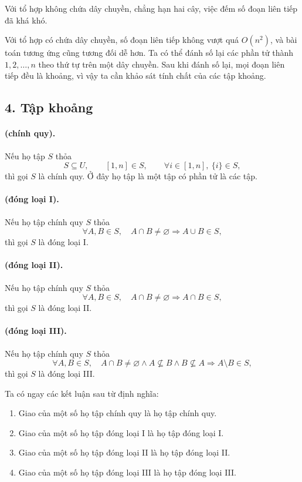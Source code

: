\documentclass[11pt]{article}
\begin{document}
Với tổ hợp không chứa dây chuyền, chẳng hạn hai cây, việc đếm số đoạn liên
tiếp đã khá khó.

Với tổ hợp có chứa dây chuyền, số đoạn liên tiếp không vượt quá $O(n^2)$, và
bài toán tương ứng cũng tương đối dễ hơn. Ta có thể đánh số lại các phần tử
thành $1,2,\ldots,n$ theo thứ tự trên một dây chuyền. Sau khi đánh số lại, mọi
đoạn liên tiếp đều là khoảng, vì vậy ta cần khảo sát tính chất của các tập
khoảng.

\subsection*{4. Tập khoảng}

\paragraph{ (chính quy).}
Nếu họ tập $S$ thỏa
\[
  S\subseteq U,\qquad [1,n]\in S,\qquad \forall i\in[1,n],\ \{i\}\in S,
\]
thì gọi $S$ là chính quy. Ở đây họ tập là một tập có phần tử là các tập.

\paragraph{ (đóng loại I).}
Nếu họ tập chính quy $S$ thỏa
\[
  \forall A,B\in S,\quad A\cap B\ne\varnothing \Rightarrow A\cup B\in S,
\]
thì gọi $S$ là đóng loại I.

\paragraph{ (đóng loại II).}
Nếu họ tập chính quy $S$ thỏa
\[
  \forall A,B\in S,\quad A\cap B\ne\varnothing \Rightarrow A\cap B\in S,
\]
thì gọi $S$ là đóng loại II.

\paragraph{ (đóng loại III).}
Nếu họ tập chính quy $S$ thỏa
\[
  \forall A,B\in S,\quad
  A\cap B\ne\varnothing \land A\nsubseteq B \land B\nsubseteq A
  \Rightarrow A\setminus B\in S,
\]
thì gọi $S$ là đóng loại III.

Ta có ngay các kết luận sau từ định nghĩa:
\begin{enumerate}
  \item Giao của một số họ tập chính quy là họ tập chính quy.
  \item Giao của một số họ tập đóng loại I là họ tập đóng loại I.
  \item Giao của một số họ tập đóng loại II là họ tập đóng loại II.
  \item Giao của một số họ tập đóng loại III là họ tập đóng loại III.
\end{enumerate}
\end{document}
